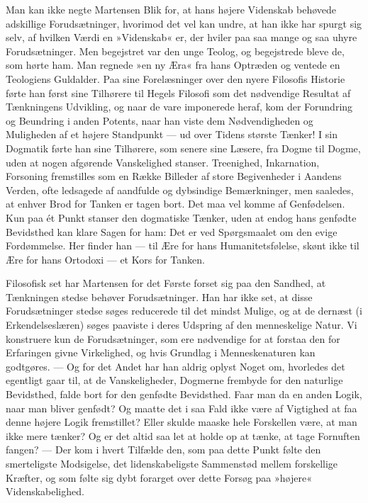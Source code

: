 \documentclass[12pt,a4paper,openany]{book}
\newcommand{\opage}[1]{\marginnote{\footnotesize\textit{[#1]}}}
\begin{document}
Man kan ikke negte Martensen Blik for, at hans
højere Videnskab behøvede adskillige Forudsætninger,
hvorimod det vel kan undre, at han ikke har spurgt sig
selv, af hvilken Værdi en »Videnskab« er, der hviler
paa saa mange og saa uhyre Forudsætninger. Men begejstret
var den unge Teolog, og begejstrede bleve de,
som hørte ham. Man regnede »en ny Æra« fra hans
Optræden og ventede en Teologiens Guldalder. Paa sine
Forelæsninger over den nyere Filosofis Historie førte han
først sine Tilhørere til Hegels Filosofi som det nødvendige
Resultat af Tænkningens Udvikling, og naar de vare
imponerede heraf, kom der Forundring og Beundring i
anden Potents, naar han viste dem Nødvendigheden og
Muligheden af et højere Standpunkt --- ud over Tidens
største Tænker! I sin Dogmatik førte han sine Tilhørere,
som senere sine Læsere, fra Dogme til Dogme, uden at
nogen afgørende Vanskelighed stanser. Treenighed,
Inkarnation, Forsoning fremstilles som en Række Billeder
af store Begivenheder i Aandens Verden, ofte ledsagede
af aandfulde og dybsindige Bemærkninger, men
saaledes, at enhver Brod for Tanken er tagen bort. Det
\opage{20}maa vel komme af Genfødelsen. Kun paa ét Punkt
stanser den dogmatiske Tænker, uden at endog hans genfødte
Bevidsthed kan klare Sagen for ham: Det er ved
Spørgsmaalet om den evige Fordømmelse. Her finder han
--- til Ære for hans Humanitetsfølelse, skønt ikke til Ære
for hans Ortodoxi --- et Kors for Tanken.

Filosofisk set har Martensen for det Første forset sig
paa den Sandhed, at Tænkningen stedse behøver Forudsætninger.
Han har ikke set, at disse Forudsætninger stedse
søges reducerede til det mindst Mulige, og at de dernæst
(i Erkendelseslæren) søges paaviste i deres Udspring af
den menneskelige Natur. Vi konstruere kun de Forudsætninger,
som ere nødvendige for at forstaa den for Erfaringen
givne Virkelighed, og hvis Grundlag i Menneskenaturen
kan godtgøres. --- Og for det Andet har han
aldrig oplyst Noget om, hvorledes det egentligt gaar til,
at de Vanskeligheder, Dogmerne frembyde for den naturlige
Bevidsthed, falde bort for den genfødte Bevidsthed.
Faar man da en anden Logik, naar man bliver genfødt?
Og maatte det i saa Fald ikke være af Vigtighed at faa
denne højere Logik fremstillet? Eller skulde maaske
hele Forskellen være, at man ikke mere tænker? Og er
det altid saa let at holde op at tænke, at tage Fornuften
fangen? --- Der kom i hvert Tilfælde den, som paa dette
Punkt følte den smerteligste Modsigelse, det lidenskabeligste
Sammenstød mellem forskellige Kræfter, og som
følte sig dybt forarget over dette Forsøg paa »højere«
Videnskabelighed.
\end{document}
